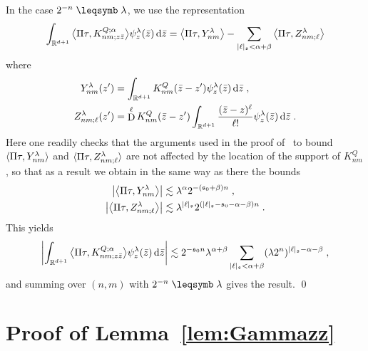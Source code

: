 \documentclass[reqno,11pt]{article}
\def\fraks{\mathfrak{s}}
\def\abss#1{\abs{#1}_\mathfrak{s}}
\DeclareMathOperator{\D}{D}            %
\begin{document}
In the case $2^{-n}\leqs \lambda$, we use the representation 
\begin{equation}
\label{eq:decomp_YZ} 
 \int_{\R^{d+1}} \bigpscal{\Pi\tau}{K^{Q;\alpha}_{nm;z\bar z}}
\psi^\lambda_z(\bar z) \6\bar z 
 = \bigpscal{\Pi\tau}{Y^\lambda_{nm}} 
 - \sum_{\abss{\ell} < \alpha+\beta} \bigpscal{\Pi\tau}{Z^{\lambda}_{nm;\ell}}
\end{equation} 
where 
\begin{align}
\nonumber
Y^\lambda_{nm}(z') &= 
 \int_{\R^{d+1}} K^Q_{nm} (\bar z - z') \psi^\lambda_z(\bar z)\6\bar z\;, \\
 Z^\lambda_{nm;\ell}(z') &= 
 \D^\ell K^Q_{nm} (\bar z - z') 
 \int_{\R^{d+1}} \frac{(\bar z-z)^\ell}{\ell!}\psi^\lambda_z(\bar z)\6\bar z\;.
\end{align}
Here one readily checks that the arguments used in the proof
of~\cite[Lem.~5.19]{Hairer2014} to bound $\langle\Pi\tau,Y^\lambda_{nm}\rangle$ and
$\langle\Pi\tau,Z^\lambda_{nm;\ell}\rangle$ are not affected by the location of the
support of $K^Q_{nm}$, so that as a result we obtain in the same way as there 
the bounds 
\begin{align}
\nonumber
 \bigabs{\bigpscal{\Pi\tau}{Y^\lambda_{nm}}} 
 &\lesssim \lambda^\alpha 2^{-(\fraks_0+\beta)n}\;, \\
 \bigabs{\bigpscal{\Pi\tau}{Z^\lambda_{nm;\ell}}}
 &\lesssim \lambda^{\abss{\ell}} 2^{(\abss{\ell}-\fraks_0-\alpha-\beta)n}\;.
 \label{eq:bounds_YZ} 
\end{align} 
This yields 
\begin{equation}
 \biggabs{\int_{\R^{d+1}} \bigpscal{\Pi\tau}{K^{Q;\alpha}_{nm;z\bar z}}
\psi^\lambda_z(\bar z) \6\bar z} 
\lesssim 2^{-\fraks_0 n} \lambda^{\alpha+\beta} 
\sum_{\abss{\ell} < \alpha+\beta} (\lambda 2^n)^{\abss{\ell}-\alpha-\beta}\;,
\end{equation} 
and summing over $(n,m)$ with $2^{-n}\leqs \lambda$ gives the result. 
\qed


\section{Proof of Lemma~\ref{lem:Gammazz}}
\label{app:Gammazz} 
\end{document}
